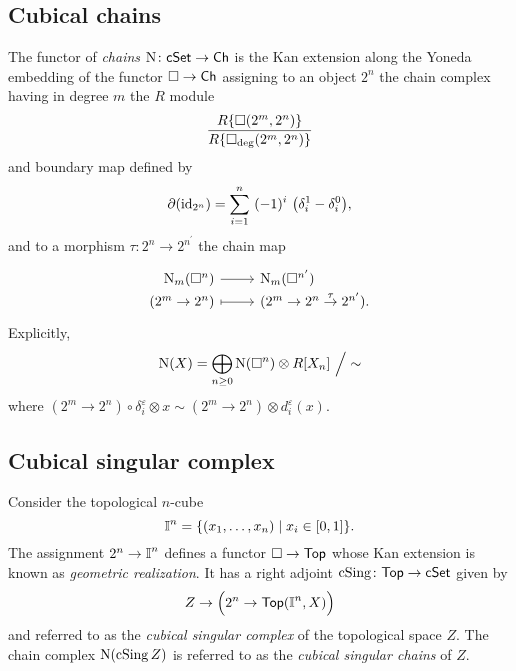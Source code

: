 \subsection{Cubical chains}

The functor of \textit{chains} $\operatorname{N} \colon \mathsf{cSet} \to \mathsf{Ch}$ is the Kan extension along the Yoneda embedding of the functor $\square \to \mathsf{Ch}$ assigning to an object $2^n$ the chain complex having in degree $m$ the $R$ module
\begin{equation*}
\frac{R\{\square(2^m, 2^n)\}}{R\{\square_{\deg}(2^m, 2^n)\}}
\end{equation*}
and boundary map defined by
\begin{equation*}
\partial (\id_{2^n}) = \sum_{i=1}^{n} \ (-1)^i \
\big(\delta_i^1 - \delta_i^0 \big),
\end{equation*}
and to a morphism $\tau \colon 2^n \to 2^{n^\prime}$ the chain map
\begin{equation*}
\begin{tikzcd}[row sep=-3pt, column sep=normal,
/tikz/column 1/.append style={anchor=base east},
/tikz/column 2/.append style={anchor=base west}]
\chains_m(\cube^n) \arrow[r] &  \chains_m(\cube^{n^\prime}) \\
(2^m \to 2^n) \arrow[r, mapsto] & (2^m \to 2^n \stackrel{\tau}{\to} 2^{n^\prime}).
\end{tikzcd}
\end{equation*}
Explicitly,
\begin{equation*}
\operatorname{N}(X) = \bigoplus_{n \geq 0} \operatorname{N}(\square^n) \otimes R[X_n] \ \Big/ \sim
\end{equation*}
where $(2^m \to 2^n) \circ \delta_i^\varepsilon \otimes x \sim (2^m \to 2^n) \otimes d_i^\varepsilon(x)$.

\subsection{Cubical singular complex}

Consider the topological $n$-cube
\begin{equation*}
\bm{\mathbb{I}}^{n} = \{(x_1, \dots, x_n) \mid x_i \in [0,1]\}.
\end{equation*}
The assignment $2^n \to \bm{\mathbb{I}}^n$ defines a functor $\square \to \mathsf{Top}$ whose Kan extension is known as \textit{geometric realization}.
It has a right adjoint $\operatorname{cSing} \colon \mathsf{Top} \to \mathsf{cSet}$ given by
\begin{equation*}
Z \to \Big(2^n \to \mathsf{Top}(\bm{\mathbb{I}}^n, X)\Big)
\end{equation*}
and referred to as the \textit{cubical singular complex} of the topological space $Z$.
The chain complex $\operatorname{N}(\operatorname{cSing} Z)$ is referred to as the \textit{cubical singular chains} of $Z$.
